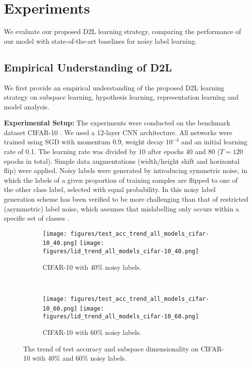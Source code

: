 \documentclass{article}
\begin{document}
\section{Experiments}\label{sec:experiments}
We evaluate our proposed D2L learning strategy, comparing the performance of our model with state-of-the-art baselines for noisy label learning.

\subsection{Empirical Understanding of D2L}
\label{sec:understanding}
We first provide an empirical understanding of the proposed D2L learning strategy on subspace learning, hypothesis learning, representation learning and model analysis.

\textbf{Experimental Setup:}
The experiments were conducted on the benchmark dataset CIFAR-10 \cite{krizhevsky2009learning}. We used a 12-layer CNN architecture.
All networks were trained using SGD with momentum 0.9, weight decay $10^{-4}$ and an initial learning rate of 0.1. The learning rate was divided by 10 after epochs 40 and 80 ($T=120$ epochs in total). 
Simple data augmentations (width/height shift and horizontal flip) were applied. Noisy labels were generated by introducing symmetric noise, in which the labels of a given proportion of training samples are flipped to one of the other class label, selected with equal probability. In \cite{vahdat2017toward} this noisy label generation scheme has been verified to be more challenging than that of restricted (asymmetric) label noise, which assumes that mislabelling only occurs within a specific set of classes \cite{reed2014training,patrini2017making}. 

\begin{figure}[!tb]
\centering
\begin{subfigure}{.5\textwidth}
  \centering
  \texttt{[image: figures/test\_acc\_trend\_all\_models\_cifar-10\_40.png]}
\texttt{[image: figures/lid\_trend\_all\_models\_cifar-10\_40.png]}
  \caption{CIFAR-10 with 40\% noisy labels.}
  \label{fig:dimensionality_1}
\end{subfigure} \\
\begin{subfigure}{.5\textwidth}
  \centering
  \texttt{[image: figures/test\_acc\_trend\_all\_models\_cifar-10\_60.png]}
\texttt{[image: figures/lid\_trend\_all\_models\_cifar-10\_60.png]}
  \caption{CIFAR-10 with 60\% noisy labels.}
  \label{fig:dimensionality_2}
\end{subfigure}
\caption{The trend of test accuracy and subspace dimensionality on CIFAR-10 with 40\% and 60\% noisy labels.}
\label{fig:dimensionality}
\vspace{-0.2in}
\end{figure}
\end{document}
